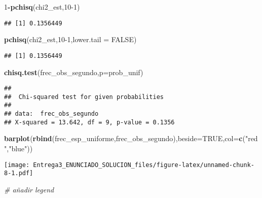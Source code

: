 \documentclass[
]{article}
\newenvironment{Shaded}{\begin{snugshade}}{\end{snugshade}}
\newcommand{\CommentTok}[1]{\textcolor[rgb]{0.56,0.35,0.01}{\textit{#1}}}
\newcommand{\DataTypeTok}[1]{\textcolor[rgb]{0.13,0.29,0.53}{#1}}
\newcommand{\DecValTok}[1]{\textcolor[rgb]{0.00,0.00,0.81}{#1}}
\newcommand{\KeywordTok}[1]{\textcolor[rgb]{0.13,0.29,0.53}{\textbf{#1}}}
\newcommand{\NormalTok}[1]{#1}
\newcommand{\OperatorTok}[1]{\textcolor[rgb]{0.81,0.36,0.00}{\textbf{#1}}}
\newcommand{\OtherTok}[1]{\textcolor[rgb]{0.56,0.35,0.01}{#1}}
\newcommand{\StringTok}[1]{\textcolor[rgb]{0.31,0.60,0.02}{#1}}
\begin{document}
\begin{Shaded}
\begin{Highlighting}[]
\DecValTok{1}\OperatorTok{-}\KeywordTok{pchisq}\NormalTok{(chi2_est,}\DecValTok{10-1}\NormalTok{)}
\end{Highlighting}
\end{Shaded}

\begin{verbatim}
## [1] 0.1356449
\end{verbatim}

\begin{Shaded}
\begin{Highlighting}[]
\KeywordTok{pchisq}\NormalTok{(chi2_est,}\DecValTok{10-1}\NormalTok{,}\DataTypeTok{lower.tail =} \OtherTok{FALSE}\NormalTok{)}
\end{Highlighting}
\end{Shaded}

\begin{verbatim}
## [1] 0.1356449
\end{verbatim}

\begin{Shaded}
\begin{Highlighting}[]
\KeywordTok{chisq.test}\NormalTok{(frec_obs_segundo,}\DataTypeTok{p=}\NormalTok{prob_unif)}
\end{Highlighting}
\end{Shaded}

\begin{verbatim}
## 
##  Chi-squared test for given probabilities
## 
## data:  frec_obs_segundo
## X-squared = 13.642, df = 9, p-value = 0.1356
\end{verbatim}

\begin{Shaded}
\begin{Highlighting}[]
\KeywordTok{barplot}\NormalTok{(}\KeywordTok{rbind}\NormalTok{(frec_esp_uniforme,frec_obs_segundo),}\DataTypeTok{beside=}\OtherTok{TRUE}\NormalTok{,}\DataTypeTok{col=}\KeywordTok{c}\NormalTok{(}\StringTok{"red"}\NormalTok{,}\StringTok{"blue"}\NormalTok{))}
\end{Highlighting}
\end{Shaded}

\texttt{[image: Entrega3\_ENUNCIADO\_SOLUCION\_files/figure-latex/unnamed-chunk-8-1.pdf]}

\begin{Shaded}
\begin{Highlighting}[]
\CommentTok{# añadir legend}
\end{Highlighting}
\end{Shaded}
\end{document}
